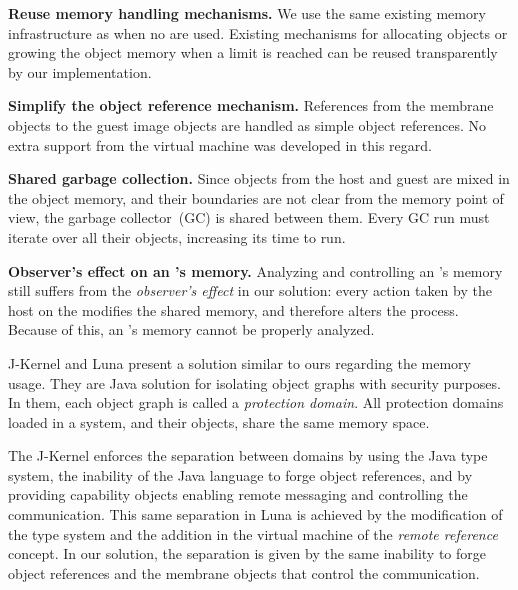 \begin{description}
	\item \textbf{Reuse memory handling mechanisms.} We use the same existing memory infrastructure as when no \objectspaces are used. Existing mechanisms for allocating objects or growing the object memory when a limit is reached can be reused transparently by our implementation. 
	\item \textbf{Simplify the object reference mechanism.} References from the membrane objects to the guest image objects are handled as simple object references. No extra support from the virtual machine was developed in this regard.
	\item \textbf{Shared garbage collection.} Since objects from the host and guest are mixed in the object memory, and their boundaries are not clear from the memory point of view, the garbage collector~(GC) is shared between them. Every GC run must iterate over all their objects, increasing its time to run.
	
	\item \textbf{Observer's effect on an \objectspace's memory.} Analyzing and controlling an \objectspace's memory still suffers from the \emph{observer's effect} in our solution: every action taken by the host on the \objectspace modifies the shared memory, and therefore alters the process. Because of this, an \objectspace's memory cannot be properly analyzed.
\end{description}

J-Kernel \cite{Hawb98a} and Luna \cite{Hawb02a} present a solution similar to ours regarding the memory usage. They are Java solution for isolating object graphs with security purposes. In them, each object graph is called a \emph{protection domain}. All protection domains loaded in a system, and their objects, share the same memory space. 

The J-Kernel enforces the separation between domains by using the Java type system, the inability of the Java language to forge object references, and by providing capability objects\cite{Levy84a,Mill03a,Spoo00a} enabling remote messaging and controlling the communication. This same separation in Luna \cite{Hawb02a} is achieved by the modification of the type system and the addition in the virtual machine of the \emph{remote reference} concept. In our solution, the separation is given by the same inability to forge object references and the membrane objects that control the communication.

